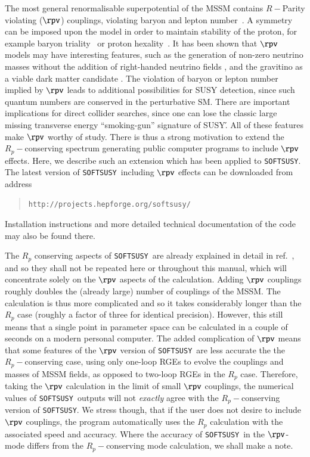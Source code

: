 \documentclass[final,3p,times,pdflatex]{elsarticle}
\def\SOFTSUSY{{\tt SOFTSUSY}}
\begin{document}
The most general renormalisable superpotential of the  MSSM
contains $R-$Parity violating ($\rpv$) 
couplings, violating
baryon and lepton number~\cite{Dreiner:1997uz}. A symmetry can be imposed upon
the model in order to maintain stability of the proton, for example baryon
triality~\cite{Ibanez:1991pr} or proton hexality~\cite{Dreiner:2007vp}.
It has been shown
that $\rpv$ models may have interesting features, such as the generation of
non-zero neutrino masses without the addition of
right-handed neutrino fields \cite{Hall:1983id}, and the gravitino as a viable
dark matter candidate \cite{Buchmuller:2007ui}. The 
violation of baryon or lepton number implied by $\rpv$ leads
to additional possibilities for SUSY detection, since such quantum numbers are 
conserved in the perturbative SM\@. There are important implications
for direct 
collider searches, since one can lose the classic large missing transverse
energy ``smoking-gun'' signature of SUSY\'. All of these features make $\rpv$
worthy of study. There is thus a strong motivation to extend the
$R_p-$conserving spectrum generating public computer programs to include
$\rpv$ effects. Here, we describe such an extension which has
been applied to \SOFTSUSY\@. The latest version of \SOFTSUSY~including
$\rpv$ effects can be downloaded from address
\begin{quote}
{\tt http://projects.hepforge.org/softsusy/}
\end{quote}
Installation instructions and more detailed technical documentation of the
code may also be found there.

The $R_p$ conserving aspects of \SOFTSUSY~are already explained in
detail in ref.~\cite{Allanach:2001kg}, and so they shall not be repeated here
or throughout this manual, which will concentrate solely on the $\rpv$ aspects of the calculation.
Adding $\rpv$ couplings roughly doubles the (already large)
number of couplings of the MSSM\@. The calculation is thus more complicated and 
so it takes considerably longer than the $R_p$ case (roughly a
factor of three for identical precision). However, this still means that a
single point in parameter space can be calculated in a couple of seconds on a
modern personal computer. 
The added complication of $\rpv$ means that some features of the 
$\rpv$ version of \SOFTSUSY~are less accurate the the $R_p-$conserving 
case, using only one-loop RGEs to evolve the couplings and masses of MSSM
fields, as opposed to two-loop RGEs in the $R_p$ case. Therefore, taking the
$\rpv$ calculation in the limit of small $\rpv$ couplings, the numerical
values of \SOFTSUSY~outputs will not {\em exactly}\/ agree with the
$R_p-$conserving 
version of \SOFTSUSY\@. 
We stress though, that if the user does not desire to include $\rpv$ couplings, 
the program automatically uses the $R_p$ calculation with the associated speed and
accuracy. Where the accuracy of \SOFTSUSY~in the $\rpv$-mode differs from the
$R_p-$conserving mode calculation, we shall make a 
note.
\end{document}

